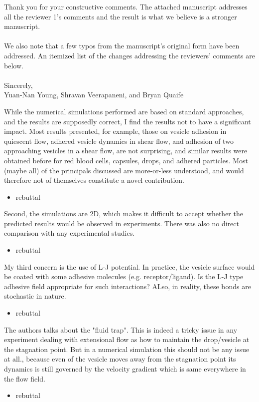 \documentclass[11pt]{article}
\newcommand{\comment}[1]{{\color{blue} #1}}
\begin{document}
\noindent
Thank you for your constructive comments.  The attached manuscript
addresses all the reviewer 1's comments and the result is what we
believe is a stronger manuscript.
\\ \\ \noindent 
We also note that a few typos from the manuscript’s original form have
been addressed. An itemized list of the changes addressing the
reviewers’ comments are below.
\\ \\ \noindent 
Sincerely, \\ \noindent
Yuan-Nan Young, Shravan Veerapaneni, and Bryan Quaife

\vspace{20pt}
\noindent
\comment{While the numerical simulations performed are based on standard
approaches, and the results are supposedly correct, I find the results
not to have a significant impact. Most results presented, for example,
those on vesicle adhesion in quiescent flow, adhered vesicle dynamics in
shear flow, and adhesion of two approaching vesicles in a shear flow,
are not surprising, and similar results were obtained before for red
blood cells, capsules, drops, and adhered particles. Most (maybe all) of
the principals discussed are more-or-less understood, and would
therefore not of themselves constitute a novel contribution.}
\begin{itemize}
  \item rebuttal
\end{itemize}

\noindent
\comment{Second, the simulations are 2D, which makes it difficult to accept
whether the predicted results would be observed in experiments. There
was also no direct comparison with any experimental studies.}
\begin{itemize}
  \item rebuttal
\end{itemize}

\noindent
\comment{My third concern is the use of L-J potential. In practice, the
vesicle surface would be coated with some adhesive molecules (e.g.
receptor/ligand). Is the L-J type adhesive field appropriate for such
interactions? ALso, in reality, these bonds are stochastic in nature.}
\begin{itemize}
  \item rebuttal
\end{itemize}

\noindent
\comment{The authors talks about the "fluid trap". This is indeed a tricky
issue in any experiment dealing with extensional flow as how to
maintain the drop/vesicle at the stagnation point. But in a numerical
simulation this should not be any issue at all., because even of the
vesicle moves away from the stagnation point its dynamics is still
governed by the velocity gradient which is same everywhere in the flow
field.}
\begin{itemize}
  \item rebuttal
\end{itemize}
\end{document}

